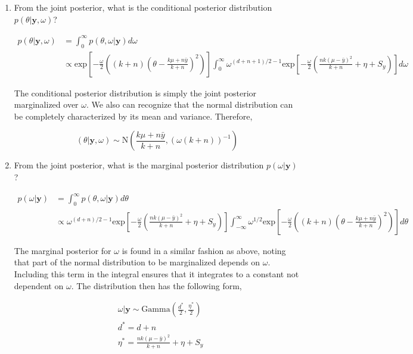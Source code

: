 \documentclass[10pt]{article}
\newcommand{\by}{\mathbf{y}}
\begin{document}
\begin{enumerate}[label=(\Alph*)]
      \item From the joint posterior, what is the conditional posterior distribution $p(\theta| \by, \omega)$?

        \begin{align*}
          p(\theta| \by, \omega) &= \int_0^{\infty} p(\theta, \omega | \by) d\omega \\
          & \propto \text{exp}\left[  -\frac{\omega}{2} \left( (k+n) \left( \theta - \frac{k\mu + n\bar{y}}{k+n}\right)^2 \right) \right] \int_0^{\infty} \omega^{(d+n+1)/2-1}  \text{exp}\left[ - \frac{\omega}{2}\left( \frac{nk(\mu - \bar{y})^2}{k+n} + \eta + S_y\right) \right] d\omega
        \end{align*}

        The conditional posterior distribution is simply the joint posterior marginalized over $\omega$. We also can recognize that the normal distribution can be completely characterized by its mean and variance. Therefore, 

        $$(\theta | \by, \omega) \sim \text{N} \left( \frac{k\mu + n \bar{y}}{k+n}, (\omega(k+n))^{-1}\right) $$

      \item From the joint posterior, what is the marginal posterior distribution $p(\omega | \by)$?

        \begin{align*}
          p(\omega| \by) &= \int_0^{\infty} p(\theta, \omega | \by) d\theta \\
          & \propto \omega^{(d+n)/2-1}  \text{exp}\left[ - \frac{\omega}{2}\left( \frac{nk(\mu - \bar{y})^2}{k+n} + \eta + S_y\right) \right] \int_{-\infty}^{\infty} \omega^{1/2}\text{exp}\left[  -\frac{\omega}{2} \left( (k+n) \left( \theta - \frac{k\mu + n\bar{y}}{k+n}\right)^2 \right) \right]  d\theta
        \end{align*}

        The marginal posterior for $\omega$ is found in a similar fashion as above, noting that part of the normal distribution to be marginalized depends on $\omega$. Including this term in the integral ensures that it integrates to a constant not dependent on $\omega$. The distribution then has the following form,

        \begin{align*}
        &\omega | \by \sim \text{Gamma}\left ( \frac{d^*}{2}, \frac{\eta^*}{2}\right) \\
        &d^* = d+n \\
        &\eta^* = \frac{nk (\mu - \bar{y})^2}{k+n} + \eta + S_y
        \end{align*}




\end{enumerate}
\end{document}
